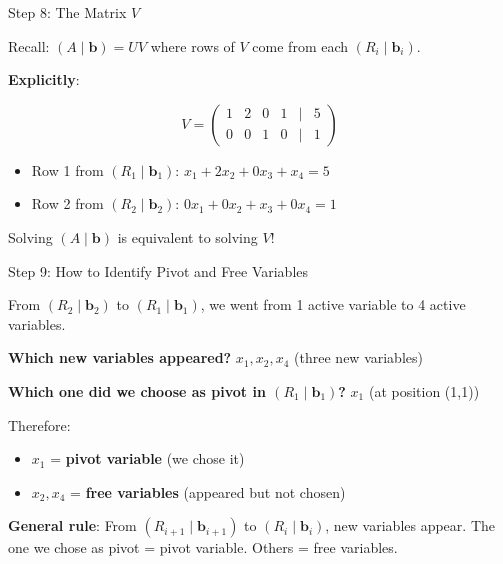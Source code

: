 \documentclass[10pt]{beamer}
\theoremstyle{definition}
\newcommand{\x}[1]{\alert{\textbf{#1}}}
\begin{document}
\begin{frame}{Step 8: The Matrix $V$}

Recall: $(A \mid \mathbf{b}) = UV$ where rows of $V$ come from each $(R_i \mid \mathbf{b}_i)$.

\vspace{0.5em}

\x{Explicitly}:

$$V = \begin{pmatrix}
1 & 2 & 0 & 1 & | & 5 \\
0 & 0 & 1 & 0 & | & 1
\end{pmatrix}$$

\vspace{0.5em}

\begin{itemize}
\item Row 1 from $(R_1 \mid \mathbf{b}_1)$: $x_1 + 2x_2 + 0x_3 + x_4 = 5$
\item Row 2 from $(R_2 \mid \mathbf{b}_2)$: $0x_1 + 0x_2 + x_3 + 0x_4 = 1$
\end{itemize}

\vspace{0.5em}

Solving $(A \mid \mathbf{b})$ is equivalent to solving $V$!

\end{frame}

\begin{frame}{Step 9: How to Identify Pivot and Free Variables}

From $(R_2 \mid \mathbf{b}_2)$ to $(R_1 \mid \mathbf{b}_1)$, we went from 1 active variable to 4 active variables.

\vspace{0.5em}

\x{Which new variables appeared?} $x_1, x_2, x_4$ (three new variables)

\vspace{0.5em}

\x{Which one did we choose as pivot in $(R_1 \mid \mathbf{b}_1)$?} $x_1$ (at position (1,1))

\vspace{0.5em}

Therefore:
\begin{itemize}
\item $x_1$ = \x{pivot variable} (we chose it)
\item $x_2, x_4$ = \x{free variables} (appeared but not chosen)
\end{itemize}

\vspace{1em}

\x{General rule}: From $(R_{i+1} \mid \mathbf{b}_{i+1})$ to $(R_i \mid \mathbf{b}_i)$, new variables appear. The one we chose as pivot = pivot variable. Others = free variables.

\end{frame}
\end{document}
